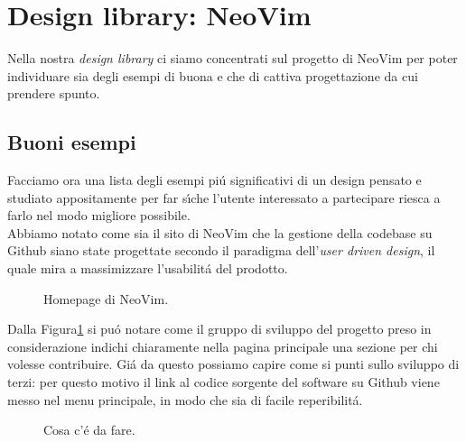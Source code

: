 \documentclass[12pt]{article} %
\begin{document}
\newpage

\section{Design library: NeoVim}
Nella nostra \emph{design library} ci siamo concentrati sul progetto di NeoVim per poter individuare sia degli esempi di buona e che di cattiva progettazione da cui prendere spunto.\\

\subsection{Buoni esempi}
Facciamo ora una lista degli esempi pi\'u significativi di un design pensato e studiato appositamente per far s\'\i che l'utente interessato a partecipare riesca a farlo nel modo migliore possibile.\\
Abbiamo notato come sia il sito di NeoVim che la gestione della codebase su Github siano state progettate secondo il paradigma dell'\emph{user driven design}, il quale mira a massimizzare l'usabilit\'a del prodotto.

\begin{figure}[H]
\caption{Homepage di NeoVim.}
\label{fig:buonesempio1}
\end{figure}

Dalla Figura\ref{fig:buonesempio1} si pu\'o notare come il gruppo di sviluppo del progetto preso in considerazione indichi chiaramente nella pagina principale una sezione per chi volesse contribuire. Gi\'a da questo possiamo capire come si punti sullo sviluppo di terzi: per questo motivo il link al codice sorgente del software su Github viene messo nel menu principale, in modo che sia di facile reperibilit\'a.

\begin{figure}[H]
\caption{Cosa c'\'e da fare.}
\label{fig:buonesempio2}
\end{figure}
\end{document}
